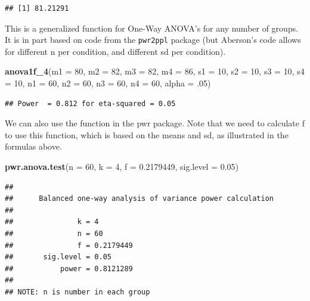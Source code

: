 \documentclass[]{book}
\newenvironment{Shaded}{\begin{snugshade}}{\end{snugshade}}
\newcommand{\DataTypeTok}[1]{\textcolor[rgb]{0.13,0.29,0.53}{#1}}
\newcommand{\DecValTok}[1]{\textcolor[rgb]{0.00,0.00,0.81}{#1}}
\newcommand{\FloatTok}[1]{\textcolor[rgb]{0.00,0.00,0.81}{#1}}
\newcommand{\KeywordTok}[1]{\textcolor[rgb]{0.13,0.29,0.53}{\textbf{#1}}}
\newcommand{\NormalTok}[1]{#1}
\begin{document}
\begin{verbatim}
## [1] 81.21291
\end{verbatim}

This is a generalized function for One-Way ANOVA's for any number of groups. It is in part based on code from the \texttt{pwr2ppl} package (but Aberson's code allows for different n per condition, and different sd per condition).

\begin{Shaded}
\begin{Highlighting}[]
\KeywordTok{anova1f_4}\NormalTok{(}\DataTypeTok{m1 =} \DecValTok{80}\NormalTok{, }\DataTypeTok{m2 =} \DecValTok{82}\NormalTok{, }\DataTypeTok{m3 =} \DecValTok{82}\NormalTok{, }\DataTypeTok{m4 =} \DecValTok{86}\NormalTok{,}
          \DataTypeTok{s1 =} \DecValTok{10}\NormalTok{, }\DataTypeTok{s2 =} \DecValTok{10}\NormalTok{, }\DataTypeTok{s3 =} \DecValTok{10}\NormalTok{, }\DataTypeTok{s4 =} \DecValTok{10}\NormalTok{,}
          \DataTypeTok{n1 =} \DecValTok{60}\NormalTok{, }\DataTypeTok{n2 =} \DecValTok{60}\NormalTok{, }\DataTypeTok{n3 =} \DecValTok{60}\NormalTok{, }\DataTypeTok{n4 =} \DecValTok{60}\NormalTok{,}
          \DataTypeTok{alpha =} \FloatTok{.05}\NormalTok{)}
\end{Highlighting}
\end{Shaded}

\begin{verbatim}
## Power  = 0.812 for eta-squared = 0.05
\end{verbatim}

We can also use the function in the pwr package. Note that we need to calculate f to use this function, which is based on the means and sd, as illustrated in the formulas above.

\begin{Shaded}
\begin{Highlighting}[]
\KeywordTok{pwr.anova.test}\NormalTok{(}\DataTypeTok{n =} \DecValTok{60}\NormalTok{,}
               \DataTypeTok{k =} \DecValTok{4}\NormalTok{,}
               \DataTypeTok{f =} \FloatTok{0.2179449}\NormalTok{,}
               \DataTypeTok{sig.level =} \FloatTok{0.05}\NormalTok{)}
\end{Highlighting}
\end{Shaded}

\begin{verbatim}
## 
##      Balanced one-way analysis of variance power calculation 
## 
##               k = 4
##               n = 60
##               f = 0.2179449
##       sig.level = 0.05
##           power = 0.8121289
## 
## NOTE: n is number in each group
\end{verbatim}
\end{document}
